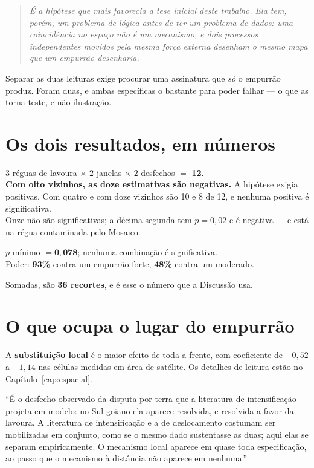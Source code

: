 \begin{quote}\itshape\color{cortinta}
É a hipótese que mais favorecia a tese inicial deste trabalho. Ela tem, porém,
um problema de lógica antes de ter um problema de dados: uma coincidência no
espaço não é um mecanismo, e dois processos independentes movidos pela mesma
força externa desenham o mesmo mapa que um empurrão desenharia.
\end{quote}

Separar as duas leituras exige procurar uma assinatura que \emph{só} o empurrão
produz. Foram duas, e ambas específicas o bastante para poder falhar --- o que
as torna teste, e não ilustração.

\section{Os dois resultados, em números}

\begin{ancora}
$3$ réguas de lavoura $\times$ $2$ janelas $\times$ $2$ desfechos $=$
\textbf{12}. \\
\textbf{Com oito vizinhos, as doze estimativas são negativas.} A hipótese
exigia positivas. Com quatro e com doze vizinhos são 10 e 8 de 12, e nenhuma
positiva é significativa. \\
Onze não são significativas; a décima segunda tem $p = 0{,}02$ e é negativa ---
e está na régua contaminada pelo Mosaico.
\end{ancora}

\begin{ancora}
$p$ mínimo $= \mathbf{0{,}078}$; nenhuma combinação é significativa. \\
Poder: \textbf{93\%} contra um empurrão forte, \textbf{48\%} contra um moderado.
\end{ancora}

Somadas, são \textbf{36 recortes}, e é esse o número que a Discussão usa.

\section{O que ocupa o lugar do empurrão}

A \textbf{substituição local} é o maior efeito de toda a frente, com coeficiente
de $-0{,}52$ a $-1{,}14$ nas células medidas em área de satélite. Os detalhes de
leitura estão no Capítulo~\ref{cap:espacial}.

\begin{nabanca}
``É o desfecho observado da disputa por terra que a literatura de intensificação
projeta em modelo: no Sul goiano ela aparece resolvida, e resolvida a favor da
lavoura. A literatura de intensificação e a de deslocamento costumam ser
mobilizadas em conjunto, como se o mesmo dado sustentasse as duas; aqui elas se
separam empiricamente. O mecanismo local aparece em quase toda especificação, ao
passo que o mecanismo à distância não aparece em nenhuma.''
\end{nabanca}

